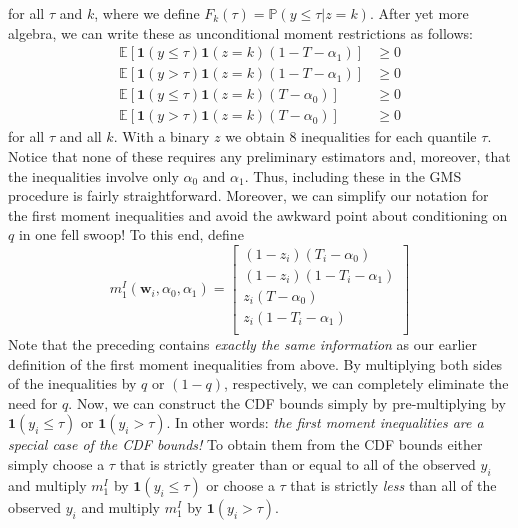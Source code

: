 \documentclass[12pt]{article}
\begin{document}
for all $\tau$ and $k$, where we define $F_k(\tau) = \mathbb{P}(y \leq \tau|z=k)$.
After yet more algebra, we can write these as unconditional moment restrictions as follows:
\begin{align*}
  \mathbb{E}\left[ \mathbf{1}(y\leq \tau) \mathbf{1}(z=k)(1 - T - \alpha_1) \right] &\geq 0\\
  \mathbb{E}\left[ \mathbf{1}(y > \tau) \mathbf{1}(z=k)(1 - T - \alpha_1) \right] &\geq 0\\
  \mathbb{E}\left[ \mathbf{1}(y\leq \tau) \mathbf{1}(z=k)(T - \alpha_0) \right] &\geq 0\\
  \mathbb{E}\left[ \mathbf{1}(y > \tau) \mathbf{1}(z=k)(T-\alpha_0) \right] &\geq 0
\end{align*}
for all $\tau$ and all $k$.
With a binary $z$ we obtain 8 inequalities for each quantile $\tau$.
Notice that none of these requires any preliminary estimators and, moreover, that the inequalities involve only $\alpha_0$ and $\alpha_1$.
Thus, including these in the GMS procedure is fairly straightforward.
Moreover, we can simplify our notation for the first moment inequalities and avoid the awkward point about conditioning on $q$ in one fell swoop!
To this end, define
\[
  m_1^I(\mathbf{w}_i, \alpha_0, \alpha_1) = \left[
  \begin{array}{l}
    (1 - z_i)(T_i - \alpha_0) \\
    (1 - z_i)(1 - T_i - \alpha_1) \\
    z_i(T - \alpha_0) \\
    z_i (1 - T_i - \alpha_1) \\
  \end{array}
\right]
\]
Note that the preceding contains \emph{exactly the same information} as our earlier definition of the first moment inequalities from above. 
By multiplying both sides of the inequalities by $q$ or $(1 - q)$, respectively, we can completely eliminate the need for $q$.
Now, we can construct the CDF bounds simply by pre-multiplying by $\mathbf{1}(y_i\leq \tau)$ or $\mathbf{1}(y_i > \tau)$.
In other words: \emph{the first moment inequalities are a special case of the CDF bounds!} 
To obtain them from the CDF bounds either simply choose a $\tau$ that is strictly greater than or equal to all of the observed $y_i$ and multiply $m_1^I$ by $\mathbf{1}(y_i \leq \tau)$ or choose a $\tau$ that is strictly \emph{less} than all of the observed $y_i$ and multiply $m_1^I$ by $\mathbf{1}(y_i > \tau)$.

\end{document}
